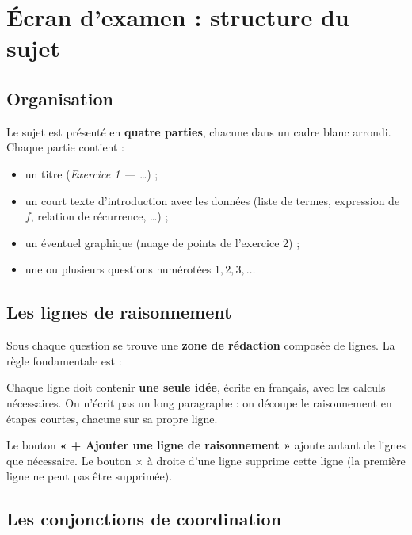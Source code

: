 \documentclass[11pt,a4paper]{article}
\begin{document}
\section{Écran d'examen : structure du sujet}

\subsection{Organisation}

Le sujet est présenté en \textbf{quatre parties}, chacune dans un cadre blanc arrondi.
Chaque partie contient :
\begin{itemize}
  \item un titre (\emph{Exercice 1 — \dots}) ;
  \item un court texte d'introduction avec les données (liste de termes, expression de
        \(f\), relation de récurrence, \dots) ;
  \item un éventuel graphique (nuage de points de l'exercice 2) ;
  \item une ou plusieurs questions numérotées \(1, 2, 3, \dots\)
\end{itemize}

\subsection{Les lignes de raisonnement}

Sous chaque question se trouve une \textbf{zone de rédaction} composée de lignes.
La règle fondamentale est :

\begin{retenir}[Une idée = une ligne]
Chaque ligne doit contenir \textbf{une seule idée}, écrite en français, avec les calculs
nécessaires. On n'écrit pas un long paragraphe : on découpe le raisonnement en étapes
courtes, chacune sur sa propre ligne.
\end{retenir}

Le bouton \textbf{« + Ajouter une ligne de raisonnement »} ajoute autant de lignes que
nécessaire. Le bouton \textbf{\(\times\)} à droite d'une ligne supprime cette ligne
(la première ligne ne peut pas être supprimée).

\subsection{Les conjonctions de coordination}
\end{document}
